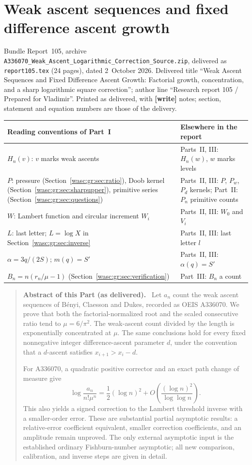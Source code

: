 \documentclass[11pt,a4paper]{article}
\newcommand{\file}[1]{\nolinkurl{#1}}
\theoremstyle{remark}\newtheorem{remark}[theorem]{Remark}
\numberwithin{equation}{section}
\newenvironment{partabstract}{\begin{quote}\small\noindent\textbf{Abstract of this Part (as delivered).}\ }{\end{quote}}
\newcommand{\partsource}[1]{\par\noindent\begin{minipage}{\textwidth}\small #1\end{minipage}\par\medskip}
\begin{document}
\part{Weak ascent sequences and fixed difference ascent growth}\label{wasc:gr:part}
\partsource{Bundle Report~105, archive \file{A336070_Weak_Ascent_Logarithmic_Correction_Source.zip}, delivered as \file{report105.tex} (24 pages), dated 2~October 2026. Delivered title ``Weak Ascent Sequences and Fixed Difference Ascent Growth: Factorial growth, concentration, and a sharp logarithmic square correction''; author line ``Research report 105 / Prepared for Vladimir''. Printed as delivered, with \textbf{[write]} notes; section, statement and equation numbers are those of the delivery.}
\begin{center}
\small
\begin{tabular}{@{}>{\raggedright\arraybackslash}p{} >{\raggedright\arraybackslash}p{}@{}}
\toprule
Reading conventions of Part~I & Elsewhere in the report\\
\midrule
$H_n(v)$: $v$ marks weak ascents & Parts~II, III: $H_n(w)$, $w$ marks levels\\
$P$: pressure (Section~\ref{wasc:gr:sec:ratio}), Doob kernel (Section~\ref{wasc:gr:sec:sharpupper}), primitive series (Section~\ref{wasc:gr:sec:questions}) & Parts~II, III: $P$, $P_w$, $P_d$ kernels; Part~II: $P_n$ primitive counts\\
$W$: Lambert function and circular increment $W_i$ & Parts~II, III: $W_0$ and $V_i$\\
$L$: last letter; $L=\log X$ in Section~\ref{wasc:gr:sec:inverse} & Parts~II, III: last letter $l$\\
$\alpha=3q/(2S)$; $m(q)=S'$ & Parts~II, III: $\alpha(q)=S'$\\
$B_n=n(r_n/\mu-1)$ (Section~\ref{wasc:gr:sec:verification}) & Part~III: $B_n$ a count\\
\bottomrule
\end{tabular}
\end{center}
\begin{partabstract}
Let $a_n$ count the weak ascent sequences of B\'enyi, Claesson and Dukes, recorded as OEIS A336070. We prove that both the factorial-normalized root and the scaled consecutive ratio tend to $\mu=6/\pi^2$. The weak-ascent count divided by the length is exponentially concentrated at $\mu$. The same conclusions hold for every fixed nonnegative integer difference-ascent parameter $d$, under the convention that a $d$-ascent satisfies $x_{i+1}>x_i-d$.

For A336070, a quadratic positive corrector and an exact path change of measure give
\[
\log\frac{a_n}{n!\mu^n}=\frac12(\log n)^2+
O\!\left(\frac{(\log n)^2}{\log\log n}\right).
\]
This also yields a signed correction to the Lambert threshold inverse with a smaller-order error. These are substantial partial asymptotic results: a relative-error coefficient equivalent, smaller correction coefficients, and an amplitude remain unproved. The only external asymptotic input is the established ordinary Fishburn-number asymptotic; all new comparison, calibration, and inverse steps are given in detail.
\end{partabstract}
\end{document}
